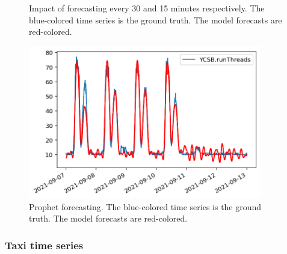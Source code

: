 \documentclass[a4paper, 12pt]{article} %
\begin{document}
	\begin{figure}\centering
		\caption{Impact of forecasting every 30 and 15 minutes respectively. The blue-colored time series is the ground truth. The model forecasts are red-colored.}
		\label{fig:results_forecasting_bank_deepar}
	\end{figure}
	
	\begin{figure} \centering
		\includegraphics[width=4in]{img/results_forecasting_bank_prophet.png}
		\caption{Prophet forecasting. The blue-colored time series is the ground truth. The model forecasts are red-colored.}
		\label{fig:results_forecasting_bank_prophet}
	\end{figure}
	
	\clearpage
	\subsubsection{Taxi time series} \label{sssec:results_forecasting_taxi}
	
\end{document}
